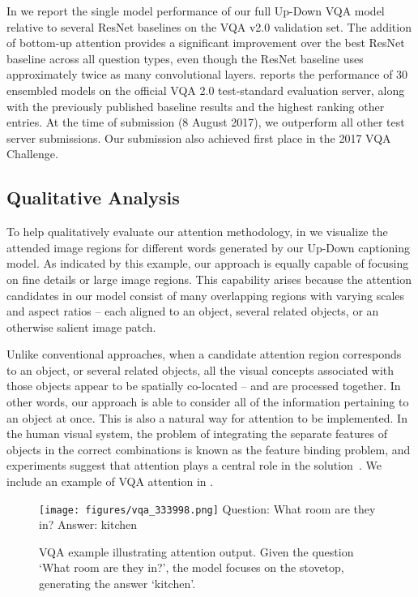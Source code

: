 \documentclass[10pt,twocolumn,letterpaper]{article}
\begin{document}
In  we report the single model performance of our full Up-Down VQA model relative to several ResNet baselines on the VQA v2.0 validation set. The addition of bottom-up attention provides a significant improvement over the best ResNet baseline across all question types, even though the ResNet baseline uses approximately twice as many convolutional layers.   reports the performance of 30 ensembled models on the official VQA 2.0 test-standard evaluation server, along with the previously published baseline results and the highest ranking other entries. At the time of submission (8 August 2017), we outperform all other test server submissions. Our submission also achieved first place in the 2017 VQA Challenge.


\subsection{Qualitative Analysis}

To help qualitatively evaluate our attention methodology, in  we visualize the attended image regions for different words generated by our Up-Down captioning model. As indicated by this example, our approach is equally capable of focusing on fine details or large image regions. This capability arises because the attention candidates in our model consist of many overlapping regions with varying scales and aspect ratios -- each aligned to an object, several related objects, or an otherwise salient image patch. 

Unlike conventional approaches, when a candidate attention region corresponds to an object, or several related objects, all the visual concepts associated with those objects appear to be spatially co-located -- and are processed together. In other words, our approach is able to consider all of the information pertaining to an object at once. This is also a natural way for attention to be implemented. In the human visual system, the problem of integrating the separate features of objects in the correct combinations is known as the feature binding problem, and experiments suggest that attention plays a central role in the solution~\cite{TreismanGelade80,treisman1982perceptual}. We include an example of VQA attention in .

\begin{figure}[t]
	\begin{center}
		\texttt{[image: figures/vqa\_333998.png]}
		Question: What room are they in?
		Answer: kitchen
	\end{center}
\caption{VQA example illustrating attention output. Given the question `What room are they in?', the model focuses on the stovetop, generating the answer `kitchen'. }
	\label{fig:vqa_example}
\end{figure}
\end{document}
